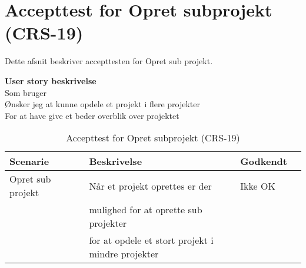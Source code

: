 \section{Accepttest for Opret subprojekt (CRS-19)}
Dette afsnit beskriver accepttesten for Opret sub projekt.

\textbf{User story beskrivelse} \\
Som bruger \\
Ønsker jeg at kunne opdele et projekt i flere projekter \\
For at have give et beder overblik over projektet

\begin{table}[H]
	\centering
	\begin{tabular}{|ll|l|ll|} \hline
		\textbf{Scenarie} &  & \textbf{Beskrivelse}&  \textbf{Godkendt}&  \\ \hline
		Opret sub projekt&  &  Når et projekt oprettes er der &  Ikke OK&  \\
		& & mulighed for at oprette sub projekter & & \\
		& & for at opdele et stort projekt i mindre projekter& & \\ \hline
	\end{tabular}
	\caption{Accepttest for Opret subprojekt (CRS-19)}
	\label{AcceptSubProjekt}
\end{table}